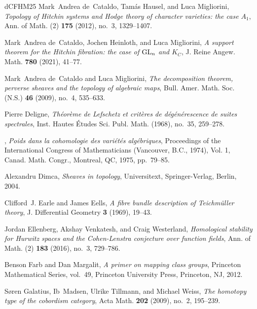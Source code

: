 \documentclass[11pt,reqno]{amsart}
\theoremstyle{plain} %
\theoremstyle{definition}
\begin{document}
\begin{thebibliography}{dCFHM25}
Mark~Andrea de~Cataldo, Tam\'as Hausel, and Luca Migliorini, \emph{Topology of
  {H}itchin systems and {H}odge theory of character varieties: the case
  {$A_1$}}, Ann. of Math. (2) \textbf{175} (2012), no.~3, 1329--1407.

Mark~Andrea de~Cataldo, Jochen Heinloth, and Luca Migliorini, \emph{A support
  theorem for the {H}itchin fibration: the case of {${\rm GL}_n$} and {$K_C$}},
  J. Reine Angew. Math. \textbf{780} (2021), 41--77. 

Mark~Andrea de~Cataldo and Luca Migliorini, \emph{The decomposition theorem,
  perverse sheaves and the topology of algebraic maps}, Bull. Amer. Math. Soc.
  (N.S.) \textbf{46} (2009), no.~4, 535--633. 

Pierre Deligne, \emph{Th\'eor\`eme de {L}efschetz et crit\`eres de
  d\'eg\'en\'erescence de suites spectrales}, Inst. Hautes \'Etudes Sci. Publ.
  Math. (1968), no.~35, 259--278. 

\bysame, \emph{Poids dans la cohomologie des vari\'et\'es alg\'ebriques},
  Proceedings of the {I}nternational {C}ongress of {M}athematicians
  ({V}ancouver, {B}.{C}., 1974), {V}ol. 1, Canad. Math. Congr., Montreal, QC,
  1975, pp.~79--85. 

Alexandru Dimca, \emph{Sheaves in topology}, Universitext, Springer-Verlag,
  Berlin, 2004. 

Clifford~J. Earle and James Eells, \emph{A fibre bundle description of
  {T}eichm\"uller theory}, J. Differential Geometry \textbf{3} (1969), 19--43.

Jordan Ellenberg, Akshay Venkatesh, and Craig Westerland, \emph{Homological
  stability for {H}urwitz spaces and the {C}ohen-{L}enstra conjecture over
  function fields}, Ann. of Math. (2) \textbf{183} (2016), no.~3, 729--786.

Benson Farb and Dan Margalit, \emph{A primer on mapping class groups},
  Princeton Mathematical Series, vol.~49, Princeton University Press,
  Princeton, NJ, 2012. 

S{\o}ren Galatius, Ib~Madsen, Ulrike Tillmann, and Michael Weiss, \emph{The
  homotopy type of the cobordism category}, Acta Math. \textbf{202} (2009),
  no.~2, 195--239.


\end{thebibliography}
\end{document}
